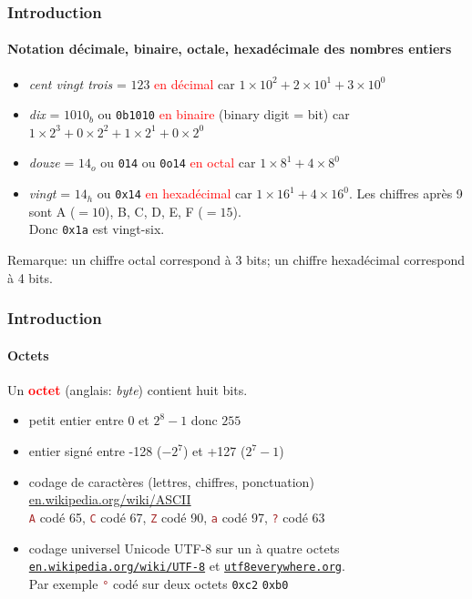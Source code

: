 \documentclass[xcolor=svgnames,final,smaller,a4]{beamer}
\begin{document}
\begin{frame}
  \frametitle{Introduction}
  \framesubtitle{Notation décimale, binaire,  octale, hexadécimale des nombres entiers}


  \begin{itemize}
    \item
    \textit
   {cent vingt trois} = $123$ \textcolor{red}{en décimal}
  car $1 \times 10^2 + 2 \times 10^1 + 3 \times 10^0$

  \item
  \textit{dix} = $1010_b$ ou \texttt{0b1010}
  \textcolor{red}{en binaire} (binary digit = bit)
  car $1  \times 2^3 + 0 \times 2^2 + 1 \times 2^1 + 0 \times 2^0$

  \item
  \textit{douze} = $14_o$ ou \texttt{014} ou \texttt{0o14}
  \textcolor{red}{en octal}
  car $1  \times 8^1 + 4 \times 8^0$

  \item \textit{vingt} =  $14_h$ ou \texttt{0x14}
  \textcolor{red}{en hexadécimal}
  car $1  \times 16^1 + 4 \times 16^0$. Les chiffres après 9 sont A ($=10$), B, C, D, E, F ($=15$). \\
  Donc \texttt{0x1a} est vingt-six.
 
  \end{itemize}
  
  \vspace{1cm}
  Remarque: un chiffre octal correspond à 3 bits; un chiffre hexadécimal correspond à 4 bits.
\end{frame}
\begin{frame}
  \frametitle{Introduction}
  \framesubtitle{Octets}

Un  \textcolor{red}{\textbf{octet}} (anglais: \textit{byte}) contient huit bits.

\begin{itemize}
\item petit entier entre $0$ et $2^8-1$ donc $255$

\item entier signé entre -128 ($-2^7$) et +127 ($2^7-1$)

\item codage de caractères (lettres, chiffres, ponctuation)
  \href{https://en.wikipedia.org/wiki/ASCII}{en.wikipedia.org/wiki/ASCII}\\
  \textcolor{brown}{\texttt{A}} codé 65,  \textcolor{brown}{\texttt{C}} codé 67,  \textcolor{brown}{\texttt{Z}} codé 90,   \textcolor{brown}{\texttt{a}} codé 97,  \textcolor{brown}{\texttt{?}} codé 63

\item codage universel Unicode UTF-8 sur un à quatre octets
\href{https://en.wikipedia.org/wiki/UTF-8}{\texttt{en.wikipedia.org/wiki/UTF-8}}
et \href{https://utf8everywhere.org/}{\texttt{utf8everywhere.org}}. \\ Par exemple \textcolor{brown}{\texttt{°}} codé sur deux octets \texttt{0xc2} \texttt{0xb0}

\end{itemize}
\end{frame}
\end{document}
